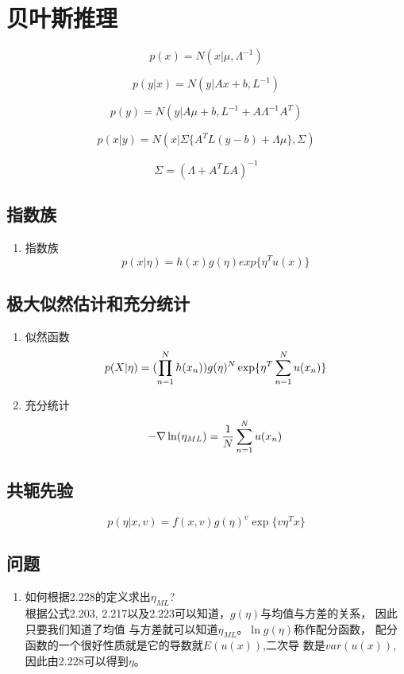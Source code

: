 \section{贝叶斯推理}
\begin{equation}
p(x) = N(x|\mu, \Lambda^{-1})
\end{equation}

\begin{equation}
p(y|x) = N(y|Ax + b, L^{-1})
\end{equation}

\begin{equation}
p(y) = N(y|A\mu + b, L^{-1} + A\Lambda^{-1}A^T)
\end{equation}

\begin{equation}
p(x|y) = N(x|\Sigma\{A^TL(y-b) + \Lambda\mu\}, \Sigma)
\end{equation}

\begin{equation}
\Sigma = (\Lambda + A^TLA)^{-1}
\end{equation}

\subsection{指数族}

\begin{enumerate}
\item 指数族
\begin{equation}
p(x|\eta) = h(x)g(\eta)exp\{\eta^Tu(x)\}
\end{equation}
\end{enumerate}

\subsection{极大似然估计和充分统计}

\begin{enumerate}
\item 似然函数
\begin{equation}
p(X|\eta) = (\prod_{n=1}^Nh(x_n))g(\eta)^N \exp \{
\eta^T \sum_{n=1}^N u(x_n)
\}
\end{equation}
\item 充分统计
\begin{equation}
-\nabla\ln(\eta_{ML}) = \frac{1}{N}\sum_{n=1}^N{u(x_n)}
\end{equation}
\end{enumerate}

\subsection{共轭先验}
\begin{equation}
p(\eta|x, v) = f(x, v)g(\eta)^v\exp\{v\eta^Tx\}
\end{equation}


\subsection{问题}
\begin{enumerate}
\item 如何根据2.228的定义求出$\eta_{ML}$?\\
根据公式2.203, 2.217以及2.223可以知道，$g(\eta)$与均值与方差的关系，
因此只要我们知道了均值
与方差就可以知道$\eta_{ML}$。$\ln g(\eta)$称作配分函数，
配分函数的一个很好性质就是它的导数就$E(u(x))$,二次导
数是$var(u(x))$,因此由2.228可以得到$\eta$。
\end{enumerate}
